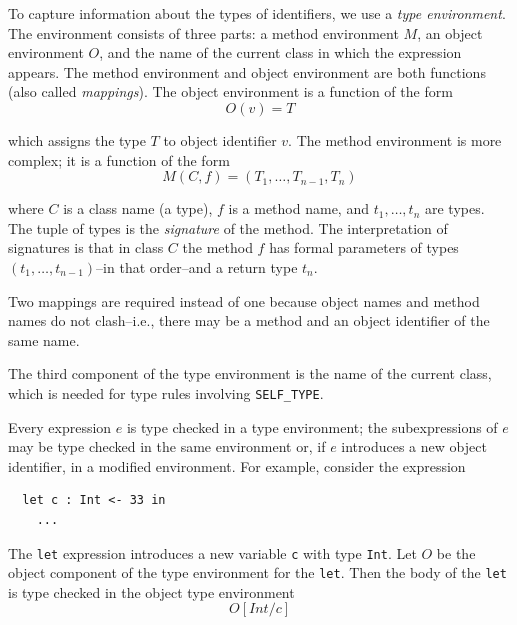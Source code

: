 \documentclass[]{article}
\begin{document}
To capture information about the types of identifiers, we use a
\emph{type environment}. The environment consists of three parts: a
method environment $M$, an object environment $O$, and the name of the
current class in which the expression appears. The method environment
and object environment are both functions (also called \emph{mappings}).
The object environment is a function of the form \\

\begin{displaymath}O(v) = T \end{displaymath}

which assigns the type $ T$ to object identifier $ v$. The method
environment is more complex; it is a function of the form \\

\begin{displaymath}M(C,f) = (T_1,\ldots,T_{n-1},T_n) \end{displaymath}

where $ C$ is a class name (a type), $f$ is a method name, and
$ t_1,\ldots,t_n$ are types. The tuple of types is the \emph{signature}
of the method. The interpretation of signatures is that in class $ C$
the method $f$ has formal parameters of types
$ (t_1,\ldots,t_{n-1})$--in that order--and a return type $t_n$.

Two mappings are required instead of one because object names and method
names do not clash--i.e., there may be a method and an object identifier
of the same name.

The third component of the type environment is the name of the current
class, which is needed for type rules involving \texttt{SELF\_TYPE}.

Every expression $e$ is type checked in a type environment; the
subexpressions of $e$ may be type checked in the same environment or, if
$e$ introduces a new object identifier, in a modified environment. For
example, consider the expression

\begin{verbatim}
  let c : Int <- 33 in
    ...
\end{verbatim}

The \texttt{let} expression introduces a new variable \texttt{c} with
type \texttt{Int}. Let $O$ be the object component of the type
environment for the \texttt{let}. Then the body of the \texttt{let} is
type checked in the object type environment \\

\begin{displaymath}O[Int/c] \end{displaymath}
\end{document}
